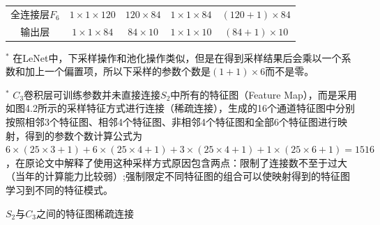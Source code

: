 \documentclass[12pt,a4paper,UTF8,twoside]{book}
\begin{document}
\begin{longtable}[]{@{}ccccc@{}}
\begin{minipage}[t]{0.12\columnwidth}\centering
全连接层\(F_6\)\strut
\end{minipage} & \begin{minipage}[t]{0.16\columnwidth}\centering
\(1\times1\times120\)\strut
\end{minipage} & \begin{minipage}[t]{0.19\columnwidth}\centering
\(120\times84\)\strut
\end{minipage} & \begin{minipage}[t]{0.16\columnwidth}\centering
\(1\times1\times84\)\strut
\end{minipage} & \begin{minipage}[t]{0.24\columnwidth}\centering
\((120+1)\times84\)\strut
\end{minipage}\tabularnewline
\begin{minipage}[t]{0.12\columnwidth}\centering
输出层\strut
\end{minipage} & \begin{minipage}[t]{0.16\columnwidth}\centering
\(1\times1\times84\)\strut
\end{minipage} & \begin{minipage}[t]{0.19\columnwidth}\centering
\(84\times10\)\strut
\end{minipage} & \begin{minipage}[t]{0.16\columnwidth}\centering
\(1\times1\times10\)\strut
\end{minipage} & \begin{minipage}[t]{0.24\columnwidth}\centering
\((84+1)\times10\)\strut
\end{minipage}\tabularnewline
\bottomrule
\end{longtable}

\(^*\) 在LeNet中，下采样操作和池化操作类似，但是在得到采样结果后会乘以一个系数和加上一个偏置项，所以下采样的参数个数是\((1+1)\times6\)而不是零。

\(^*\) \(C_3\)卷积层可训练参数并未直接连接\(S_2\)中所有的特征图（Feature Map），而是采用如图4.2所示的采样特征方式进行连接（稀疏连接），生成的16个通道特征图中分别按照相邻3个特征图、相邻4个特征图、非相邻4个特征图和全部6个特征图进行映射，得到的参数个数计算公式为\(6\times(25\times3+1)+6\times(25\times4+1)+3\times(25\times4+1)+1\times(25\times6+1)=1516\)，在原论文中解释了使用这种采样方式原因包含两点：限制了连接数不至于过大（当年的计算能力比较弱）;强制限定不同特征图的组合可以使映射得到的特征图学习到不同的特征模式。

\(S_2\)与\(C_3\)之间的特征图稀疏连接
\end{document}
